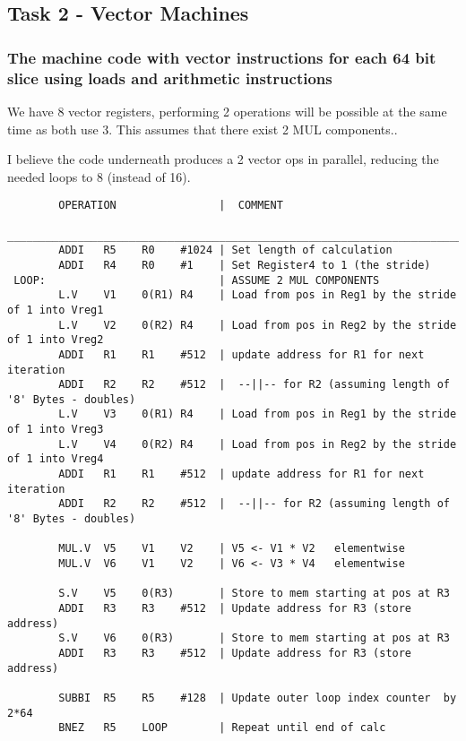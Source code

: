 \documentclass[a4paper,10pt]{article}
\begin{document}
\newpage
\subsection{Task 2 - Vector Machines}
\subsubsection{The machine code with vector instructions for each 64 bit slice using loads and arithmetic instructions}
We have 8 vector registers, performing 2 operations will be possible at the same time as both use 3.
This assumes that there exist 2 MUL components..

I believe the code underneath produces a 2 vector ops in parallel, reducing the needed loops to 8 (instead of 16).
\begin{verbatim}
        OPERATION                |  COMMENT
 __________________________________________________________________________________________
        ADDI   R5    R0    #1024 | Set length of calculation
        ADDI   R4    R0    #1    | Set Register4 to 1 (the stride) 
 LOOP:                           | ASSUME 2 MUL COMPONENTS
        L.V    V1    0(R1) R4    | Load from pos in Reg1 by the stride of 1 into Vreg1
        L.V    V2    0(R2) R4    | Load from pos in Reg2 by the stride of 1 into Vreg2
        ADDI   R1    R1    #512  | update address for R1 for next iteration
        ADDI   R2    R2    #512  |  --||-- for R2 (assuming length of '8' Bytes - doubles)
        L.V    V3    0(R1) R4    | Load from pos in Reg1 by the stride of 1 into Vreg3
        L.V    V4    0(R2) R4    | Load from pos in Reg2 by the stride of 1 into Vreg4
        ADDI   R1    R1    #512  | update address for R1 for next iteration
        ADDI   R2    R2    #512  |  --||-- for R2 (assuming length of '8' Bytes - doubles)

        MUL.V  V5    V1    V2    | V5 <- V1 * V2   elementwise
        MUL.V  V6    V1    V2    | V6 <- V3 * V4   elementwise

        S.V    V5    0(R3)       | Store to mem starting at pos at R3
        ADDI   R3    R3    #512  | Update address for R3 (store address)
        S.V    V6    0(R3)       | Store to mem starting at pos at R3
        ADDI   R3    R3    #512  | Update address for R3 (store address)

        SUBBI  R5    R5    #128  | Update outer loop index counter  by 2*64  
        BNEZ   R5    LOOP        | Repeat until end of calc
\end{verbatim}
\end{document}
